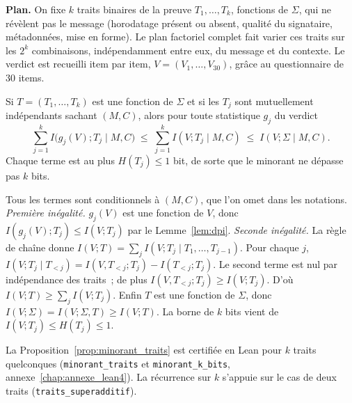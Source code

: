 \begin{sloppypar}
\noindent\textbf{Plan.} On fixe $k$ traits binaires de la preuve
$T_1, \dots, T_k$, fonctions de $\Sigma$, qui ne r\'ev\`elent pas le message
(horodatage pr\'esent ou absent, qualit\'e du signataire, m\'etadonn\'ees, mise en forme).
Le plan factoriel complet fait varier ces traits sur les $2^k$ combinaisons,
ind\'ependamment entre eux, du message et du contexte. Le verdict est recueilli
item par item, $V = (V_1, \dots, V_{30})$, gr\^ace au questionnaire de $30$ items.

\begin{proposition}
\label{prop:minorant_traits}
Si $T = (T_1,\dots,T_k)$ est une fonction de $\Sigma$ et si les $T_j$ sont mutuellement
ind\'ependants sachant $(M,C)$, alors pour toute statistique $g_j$ du verdict
\begin{equation}
\sum_{j=1}^{k} I\bigl(g_j(V);T_j \mid M,C\bigr) \;\leq\; \sum_{j=1}^{k} I(V;T_j \mid M,C)
\;\leq\; I(V;\Sigma \mid M,C).
\label{eq:minorant_traits}
\end{equation}
Chaque terme est au plus $H(T_j) \leq 1$ bit, de sorte que le minorant ne d\'epasse pas
$k$ bits.
\end{proposition}

\begin{Preuve}
Tous les termes sont conditionnels \`a $(M,C)$, que l'on omet dans les notations.
\emph{Premi\`ere in\'egalit\'e.} $g_j(V)$ est une fonction de $V$, donc
$I(g_j(V);T_j) \leq I(V;T_j)$ par le Lemme~\ref{lem:dpi}.
\emph{Seconde in\'egalit\'e.} La r\`egle de cha\^ine donne
$I(V;T) = \sum_j I(V;T_j \mid T_1,\dots,T_{j-1})$. Pour chaque $j$,
$I(V;T_j \mid T_{<j}) = I(V,T_{<j};T_j) - I(T_{<j};T_j)$. Le second terme est nul par
ind\'ependance des traits~; de plus $I(V,T_{<j};T_j) \geq I(V;T_j)$. D'o\`u
$I(V;T) \geq \sum_j I(V;T_j)$. Enfin $T$ est une fonction de $\Sigma$, donc
$I(V;\Sigma) = I(V;\Sigma,T) \geq I(V;T)$. La borne de $k$ bits vient de
$I(V;T_j) \leq H(T_j) \leq 1$.
\end{Preuve}

La Proposition~\ref{prop:minorant_traits} est certifi\'ee en Lean pour $k$ traits quelconques
(\texttt{minorant\_traits} et \texttt{minorant\_k\_bits}, annexe~\ref{chap:annexe_lean4}). La
r\'ecurrence sur $k$ s'appuie sur le cas de deux traits (\texttt{traits\_superadditif}).


\end{sloppypar}
